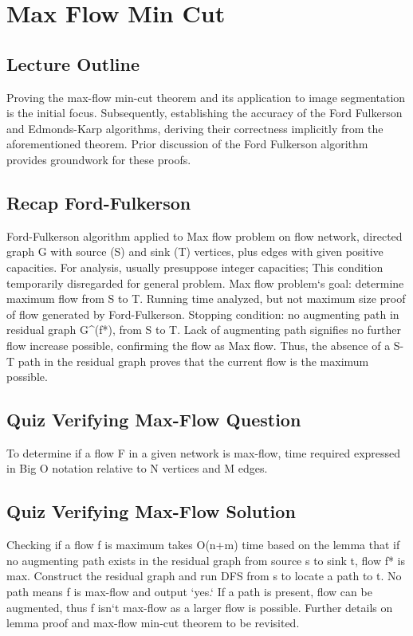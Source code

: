 \section*{Max Flow Min Cut}

\subsection*{Lecture Outline}
Proving the max-flow min-cut theorem and its application to image segmentation is the initial focus.
Subsequently, establishing the accuracy of the Ford Fulkerson and Edmonds-Karp algorithms, deriving their correctness implicitly from the aforementioned theorem.
Prior discussion of the Ford Fulkerson algorithm provides groundwork for these proofs.

\subsection*{Recap  Ford-Fulkerson}
Ford-Fulkerson algorithm applied to Max flow problem on flow network, directed graph G with source (S) and sink (T) vertices, plus edges with given positive capacities.
For analysis, usually presuppose integer capacities; This condition temporarily disregarded for general problem.
Max flow problem`s goal: determine maximum flow from S to T\@.
Running time analyzed, but not maximum size proof of flow generated by Ford-Fulkerson.
Stopping condition: no augmenting path in residual graph G\textasciicircum{}(f*), from S to T\@.
Lack of augmenting path signifies no further flow increase possible, confirming the flow as Max flow.
Thus, the absence of a S-T path in the residual graph proves that the current flow is the maximum possible.

\subsection*{Quiz  Verifying Max-Flow Question}
To determine if a flow F in a given network is max-flow, time required expressed in Big O notation relative to N vertices and M edges.

\subsection*{Quiz  Verifying Max-Flow Solution}
Checking if a flow f is maximum takes O(n+m) time based on the lemma that if no augmenting path exists in the residual graph from source s to sink t, flow f* is max.
Construct the residual graph and run DFS from s to locate a path to t.
No path means f is max-flow and output `yes.` If a path is present, flow can be augmented, thus f isn`t max-flow as a larger flow is possible.
Further details on lemma proof and max-flow min-cut theorem to be revisited.

